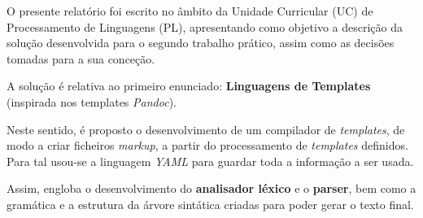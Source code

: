 \documentclass[../relatorio.tex]{subfiles}
\begin{document}
O presente relatório foi escrito no âmbito da Unidade Curricular (UC) de Processamento de Linguagens (PL), apresentando 
como objetivo a descrição da solução desenvolvida para o segundo trabalho prático, assim como as decisões 
tomadas para a sua conceção.

A solução é relativa ao primeiro enunciado: \textbf{Linguagens de Templates} (inspirada nos templates \textit{Pandoc}).

Neste sentido, é proposto o desenvolvimento de um compilador de \textit{templates},
de modo a criar ficheiros \textit{markup}, a partir do processamento de
\textit{templates} definidos. 
Para tal usou-se a linguagem \textit{YAML} para guardar toda a 
informação a ser usada.

Assim, engloba o desenvolvimento do \textbf{analisador léxico} e o \textbf{parser}, 
bem como a gramática e a estrutura da árvore sintática criadas  
para poder gerar o texto final. 
\end{document}
